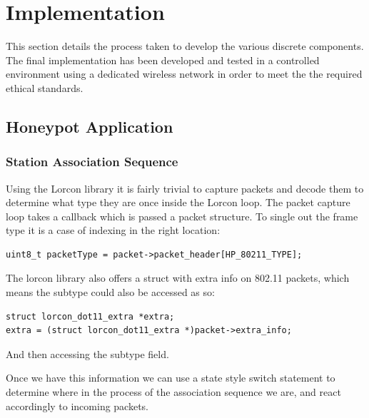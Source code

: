 \section{Implementation}
This section details the process taken to develop the various discrete components. The final implementation has been developed and tested in a controlled environment using a dedicated wireless network in order to meet the the required ethical standards.

\subsection{Honeypot Application}
\subsubsection{Station Association Sequence}
Using the Lorcon library it is fairly trivial to capture packets and decode them to determine what type they are once inside the Lorcon loop. The packet capture loop takes a callback which is passed a packet structure. To single out the frame type it is a case of indexing in the right location:

\begin{verbatim}
uint8_t packetType = packet->packet_header[HP_80211_TYPE];
\end{verbatim}
The lorcon library also offers a struct with extra info on 802.11 packets, which means the subtype could also be accessed as so:
\begin{verbatim}
struct lorcon_dot11_extra *extra;
extra = (struct lorcon_dot11_extra *)packet->extra_info;
\end{verbatim}
And then accessing the subtype field.

Once we have this information we can use a state style switch statement to determine where in the process of the association sequence we are, and react accordingly to incoming packets.

